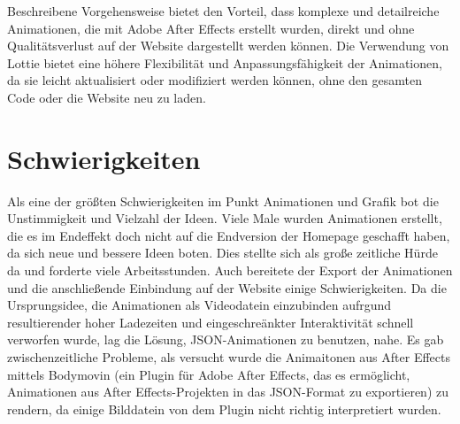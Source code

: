 Beschreibene Vorgehensweise bietet den Vorteil, dass komplexe und detailreiche Animationen, die mit Adobe After Effects erstellt wurden, 
direkt und ohne Qualitätsverlust auf der Website dargestellt werden können. Die Verwendung von Lottie bietet eine höhere 
Flexibilität und Anpassungsfähigkeit der Animationen, da sie leicht aktualisiert oder modifiziert werden können, ohne den gesamten Code 
oder die Website neu zu laden.


\section{Schwierigkeiten} \label{sec:animationen:Schwierigkeiten}

Als eine der größten Schwierigkeiten im Punkt Animationen und Grafik bot die Unstimmigkeit und Vielzahl der Ideen. Viele Male wurden Animationen
erstellt, die es im Endeffekt doch nicht auf die Endversion der Homepage geschafft haben, da sich neue und bessere Ideen boten. Dies stellte sich 
als große zeitliche Hürde da und forderte viele Arbeitsstunden.
Auch bereitete der Export der Animationen und die anschließende Einbindung auf der Website einige Schwierigkeiten. 
Da die Ursprungsidee, die Animationen als Videodatein einzubinden aufrgund resultierender hoher Ladezeiten und eingeschreänkter Interaktivität
schnell verworfen wurde, lag die Lösung, JSON-Animationen zu benutzen, nahe.
Es gab zwischenzeitliche Probleme, als versucht wurde die Animaitonen aus After Effects mittels Bodymovin (ein Plugin für Adobe After Effects, das es ermöglicht, 
Animationen aus After Effects-Projekten in das JSON-Format zu exportieren) zu rendern, da einige Bilddatein von dem Plugin nicht richtig interpretiert wurden.

